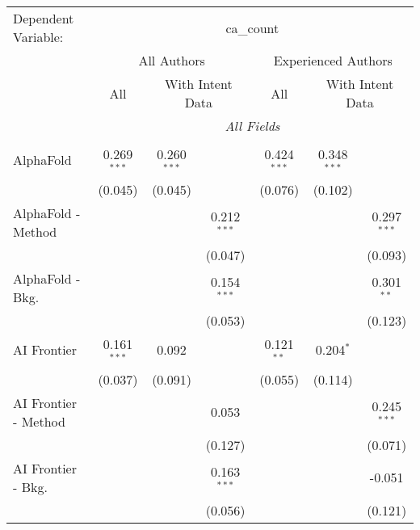 \begingroup
\centering
\begin{tabular}{lcccccc}
   \tabularnewline \midrule \midrule
   Dependent Variable: & \multicolumn{6}{c}{ca\_count}\\
 & \multicolumn{3}{c}{All Authors} & \multicolumn{3}{c}{Experienced Authors} \\
\cmidrule(lr){2-4} \cmidrule(lr){5-7}
 & \multicolumn{1}{c}{All} & \multicolumn{2}{c}{With Intent Data} & \multicolumn{1}{c}{All} & \multicolumn{2}{c}{With Intent Data} \\
\cmidrule(lr){2-2} \cmidrule(lr){3-4} \cmidrule(lr){5-5} \cmidrule(lr){6-7}
 & \multicolumn{6}{c}{\textit{All Fields}} \\ \\
   AlphaFold            & 0.269$^{***}$ & 0.260$^{***}$ &               & 0.424$^{***}$ & 0.348$^{***}$ &   \\   
                        & (0.045)       & (0.045)       &               & (0.076)       & (0.102)       &   \\   
   AlphaFold - Method   &               &               & 0.212$^{***}$ &               &               & 0.297$^{***}$\\   
                        &               &               & (0.047)       &               &               & (0.093)\\   
   AlphaFold - Bkg.     &               &               & 0.154$^{***}$ &               &               & 0.301$^{**}$\\   
                        &               &               & (0.053)       &               &               & (0.123)\\   
   AI Frontier          & 0.161$^{***}$ & 0.092         &               & 0.121$^{**}$  & 0.204$^{*}$   &   \\   
                        & (0.037)       & (0.091)       &               & (0.055)       & (0.114)       &   \\   
   AI Frontier - Method &               &               & 0.053         &               &               & 0.245$^{***}$\\   
                        &               &               & (0.127)       &               &               & (0.071)\\   
   AI Frontier - Bkg.   &               &               & 0.163$^{***}$ &               &               & -0.051\\   
                        &               &               & (0.056)       &               &               & (0.121)\\   

\end{tabular}
